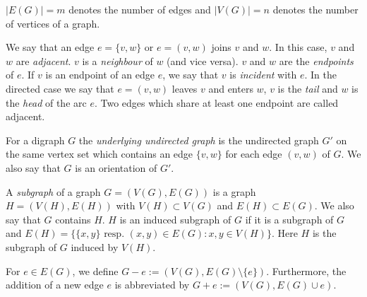 \begin{definition}
$|E(G)|=m$ denotes the number of edges and $|V(G)|=n$ denotes the number of vertices of a graph.
\end{definition}
\begin{definition}

We say that an edge $e = \{v, w\}$ or $e = (v, w)$ joins $v$ and $w$. In this case, $v$ and $w$ are \textit{adjacent}. 
$v$ is a \textit{neighbour} of $w$ (and vice versa). $v$ and $w$ are the \textit{endpoints} of $e$. If $v$ is an 
endpoint of an edge $e$, we say that $v$ is \textit{incident} with $e$. 
In the directed case we say that $e=( v, w)$ leaves $v$ and enters $w$,
$v$ is the \textit{tail} and $w$ is the \textit{head} of the arc $e$. 
Two edges which share at least one endpoint are 
called adjacent. 
\end{definition}

\begin{definition}
For a digraph $G$ the \textit{underlying undirected graph} is the undirected graph $G'$ on the same 
vertex set which contains an edge $\{v, w\}$
for each edge $(v, w)$ of $G$. We also say that $G$ is an orientation of $G'$.
\end{definition}
\begin{definition}
A \textit{subgraph} of a graph $G = (V(G), E(G))$ is a graph $H = (V(H), E(H))$
with $V(H) \subset V(G)$ and $E(H) \subset E(G)$. We also say that $G$ contains $H$. $H$ is an
induced subgraph of $G$ if it is a subgraph of $G$ and $E (H) = \{ \{x, y\} \textrm{ resp. } (x, y) \in
E(G) : x, y \in V(H)\}$. 
Here $H$ is the subgraph of $G$ induced by $V(H)$. 
\end{definition}

\begin{definition}
For $e \in E(G)$, we define $G- e := (V(G), E(G) \setminus \{e\})$. Furthermore, the addition
of a new edge $e$ is abbreviated by $G + e := (V(G), E(G) \cup {e})$. 
\end{definition}

